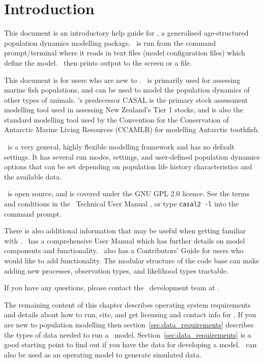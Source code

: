 \section{Introduction}\label{sec:introduction}

This document is an introductory help guide for \CNAME, a generalised age-structured population dynamics modelling package. \CNAME\ is run from the command prompt/terminal where it reads in text files (model configuration files) which define the model. \CNAME\ then prints output to the screen or a file.

This document is for users who are new to \CNAME. \CNAME\ is primarily used for assessing marine fish populations, and can be used to model the population dynamics of other types of animals. \CNAME's predecessor CASAL is the primary stock assessment modelling tool used in assessing New Zealand's Tier 1 stocks, and is also the standard modelling tool used by the Convention for the Conservation of Antarctic Marine Living Resources (CCAMLR) for modelling Antarctic toothfish. 

\CNAME\ is a very general, highly flexible modelling framework and has no default settings. It has several run modes, settings, and user-defined population dynamics options that can be set depending on population life history characteristics and the available data.

\CNAME\ is open source, and is covered under the GNU GPL 2.0 licence. See the terms and conditions in the \CNAME\ Technical User Manual \citep{CASAL2}, or type \texttt{casal2 -l} into the command prompt.

There is also additional information that may be useful when getting familiar with \CNAME. \CNAME\ has a comprehensive User Manual \citep{CASAL2} which has further details on model components and functionality. \CNAME\ also has a Contributors' Guide for users who would like to add functionality. The modular structure of the code base can make adding new processes, observation types, and likelihood types tractable.

If you have any questions, please contact the \CNAME\ development team at \email.

The remaining content of this chapter describes operating system requirements and details about how to run, cite, and get licensing and contact info for \CNAME.  If you are new to population modelling then section~\ref{sec:data_requirements} describes the types of data needed to run a \CNAME\ model. Section~\ref{sec:data_requirements} is a good starting point to find out if you have the data for developing a model. \CNAME\ can also be used as an operating model to generate simulated data.
 
